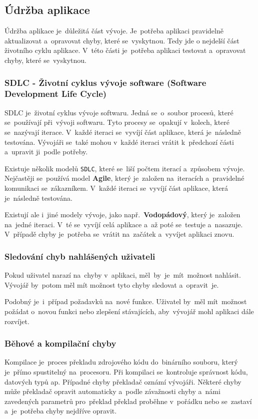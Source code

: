 \documentclass[14pt,a4paper]{article}
\begin{document}
        \subsection{Údržba aplikace}
        Údržba aplikace je~důležitá část vývoje. Je~potřeba aplikaci pravidelně aktualizovat a~opravovat chyby, které se~vyskytnou.
        Tedy jde o nejdelší část životního cyklu aplikace. V~této části je~potřeba aplikaci testovat a~opravovat chyby, které se~vyskytnou.
        
            \subsubsection{SDLC - Životní cyklus vývoje software (Software Development Life Cycle)}
            SDLC je~životní cyklus vývoje softwaru. Jedná se~o~soubor procesů, které se~používají při~vývoji softwaru.
            Tyto procesy se~opakují v~kolech, které se~nazývají iterace. V~každé iteraci se~vyvíjí část aplikace, která je~následně testována.
            Vývojáři se~také mohou v~každé iteraci vrátit k~předchozí části a~upravit ji~podle potřeby.

            Existuje několik modelů \texttt{SDLC}, které se~liší počtem iterací a~způsobem vývoje. Nejčastěji se~používá model \textbf{Agile},
            který je~založen na~iteracích a~pravidelné komunikaci se~zákazníkem. V~každé iteraci se~vyvíjí část aplikace, která je~následně testována.

            Existují ale i~jiné modely vývoje, jako např.~\textbf{Vodopádový}, který je~založen na~jedné iteraci.
            V~té se~vyvíjí celá aplikace a~až poté se~testuje a~nasazuje.
            V~případě chyby je~potřeba se~vrátit na~začátek a~vyvíjet aplikaci znovu.

            \subsubsection{Sledování chyb nahlášených uživateli}
            Pokud uživatel narazí na~chyby v~aplikaci, měl~by~je~mít~možnost nahlásit. Vývojář by~potom měl mít možnost tyto chyby sledovat a~opravit~je.

            Podobný je~i~případ požadavků na~nové funkce. Uživatel by~měl mít~možnost požádat o~novou funkci nebo zlepšení stávajících,
            aby~vývojář mohl aplikaci dále rozvíjet.

            \subsubsection{Běhové a kompilační chyby}
            Kompilace je~proces překladu zdrojového kódu do~binárního souboru, který je~přímo spustitelný na~procesoru.
            Při kompilaci se~kontroluje správnost kódu, datových typů ap. Případné chyby překladač oznámí vývojáři.
            Některé chyby může překladač opravit automaticky a~podle závažnosti chyby a~námi zavedených parametrů pro~překlad
            překlad proběhne v~pořádku nebo se~zastaví a~je~potřeba chyby nejdříve opravit.
\end{document}
